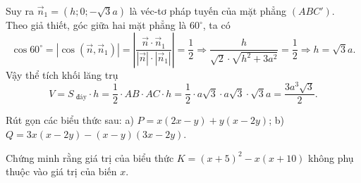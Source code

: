\begin{bt}
{$$		$$ 
		Suy ra $\overrightarrow{n}_1 = \left(h; 0; -\sqrt{3}a\right)$ là véc-tơ pháp tuyến của mặt phẳng  $(ABC')$.\\
		Theo giả thiết, góc giữa  hai mặt phẳng là $60^\circ$, ta có
		$$ 
		\cos 60^\circ = \left|\cos(\overrightarrow{n}, \overrightarrow{n}_1)\right| = \left|\dfrac{\overrightarrow{n}  \cdot \overrightarrow{n}_1}{\left|\overrightarrow{n}\right|\cdot \left|\overrightarrow{n}_1\right|}\right| = \dfrac{1}{2}
		\Rightarrow \dfrac{h}{\sqrt{2} \cdot \sqrt{h^2 + 3a^2}} = \dfrac{1}{2}  \Rightarrow h = \sqrt{3}a.
		 $$
		Vậy thể tích khối lăng  trụ
		 $$
		V = S_{\text{ đáy}} \cdot h = \dfrac{1}{2} \cdot AB \cdot AC \cdot h = \dfrac{1}{2} \cdot a\sqrt{3} \cdot a\sqrt{3} \cdot \sqrt{3}a = \dfrac{3a^3\sqrt{3}}{2}. 
		 $$
	 }
\end{bt}

\begin{bt}%
	Rút gọn các biểu thức sau:
a) $P = x(2x - y) + y(x - 2y)$;
b) $Q = 3x(x - 2y) - (x - y)(3x - 2y)$.
\end{bt}

\begin{bt}%
	Chứng minh rằng giá trị của biểu thức $K = (x + 5)^2 - x(x + 10)$ không phụ thuộc vào giá trị của biến $x$.
\end{bt}
